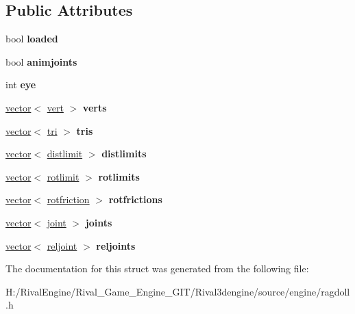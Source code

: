 \subsection*{Public Attributes}
\begin{DoxyCompactItemize}
\item 
\mbox{\label{structragdollskel_a46c162c96871f51a50ceb000b433e87f}} 
bool {\bfseries loaded}
\item 
\mbox{\label{structragdollskel_ab786f6479c95fea5cfabf2da485c1c67}} 
bool {\bfseries animjoints}
\item 
\mbox{\label{structragdollskel_abc6b01540d50e4833a610b7ea9e89503}} 
int {\bfseries eye}
\item 
\mbox{\label{structragdollskel_a4730e8081f53e3364eb1cc20e600bb97}} 
\hyperlink{structvector}{vector}$<$ \hyperlink{structragdollskel_1_1vert}{vert} $>$ {\bfseries verts}
\item 
\mbox{\label{structragdollskel_a3e939c4a3fb1c5420e01a0fbe549e4c8}} 
\hyperlink{structvector}{vector}$<$ \hyperlink{structragdollskel_1_1tri}{tri} $>$ {\bfseries tris}
\item 
\mbox{\label{structragdollskel_a68a0b01436da6c0477f1adaae347b17e}} 
\hyperlink{structvector}{vector}$<$ \hyperlink{structragdollskel_1_1distlimit}{distlimit} $>$ {\bfseries distlimits}
\item 
\mbox{\label{structragdollskel_a81685f0cbd4cb9477fc9eaebe8d70a49}} 
\hyperlink{structvector}{vector}$<$ \hyperlink{structragdollskel_1_1rotlimit}{rotlimit} $>$ {\bfseries rotlimits}
\item 
\mbox{\label{structragdollskel_a4278b3248f3883cb14d60fc4b256a32d}} 
\hyperlink{structvector}{vector}$<$ \hyperlink{structragdollskel_1_1rotfriction}{rotfriction} $>$ {\bfseries rotfrictions}
\item 
\mbox{\label{structragdollskel_afeaf28d0c5586f7b4bcbaedc12d47750}} 
\hyperlink{structvector}{vector}$<$ \hyperlink{structragdollskel_1_1joint}{joint} $>$ {\bfseries joints}
\item 
\mbox{\label{structragdollskel_a40d30a0a33fdf81c02c0d38ba76a6200}} 
\hyperlink{structvector}{vector}$<$ \hyperlink{structragdollskel_1_1reljoint}{reljoint} $>$ {\bfseries reljoints}
\end{DoxyCompactItemize}


The documentation for this struct was generated from the following file\+:\begin{DoxyCompactItemize}
\item 
H\+:/\+Rival\+Engine/\+Rival\+\_\+\+Game\+\_\+\+Engine\+\_\+\+G\+I\+T/\+Rival3dengine/source/engine/ragdoll.\+h\end{DoxyCompactItemize}
